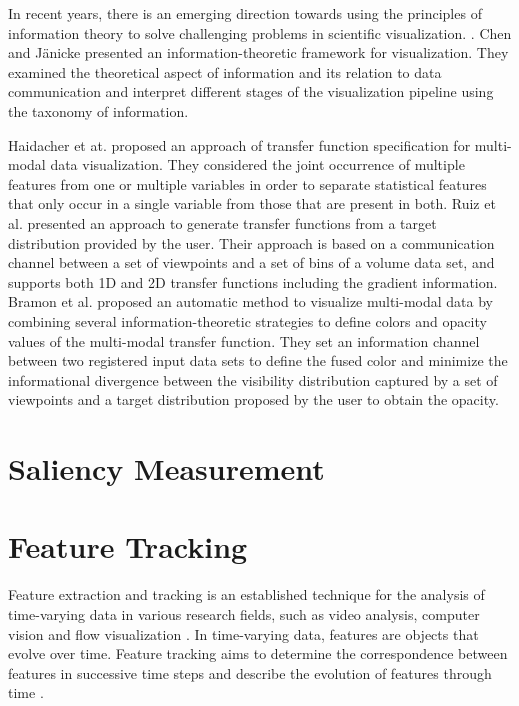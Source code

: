 In recent years, there is an emerging direction towards using the principles of information theory to solve challenging problems in scientific visualization. \cite{wang_information_2011}. Chen and J{\"a}nicke \cite{chen_information-theoretic_2010} presented an information-theoretic framework for visualization. They examined the theoretical aspect of information and its relation to data communication and interpret different stages of the visualization pipeline using the taxonomy of information.

Haidacher et at. \cite{haidacher_information-based_2008} proposed an approach of transfer function specification for multi-modal data visualization. They considered the joint occurrence of multiple features from one or multiple variables in order to separate statistical features that only occur in a single variable from those that are present in both.
Ruiz et al. \cite{ruiz_automatic_2011} presented an approach to generate transfer functions from a target distribution provided by the user. Their approach is based on a communication channel between a set of viewpoints and a set of bins of a volume data set, and supports both 1D and 2D transfer functions including the gradient information.
Bramon et al. \cite{bramon_information_2013} proposed an automatic method to visualize multi-modal data by combining several information-theoretic strategies to define colors and opacity values of the multi-modal transfer function.
They set an information channel between two registered input data sets to define the fused color and minimize the informational divergence between the visibility distribution captured by a set of viewpoints and a target distribution proposed by the user to obtain the opacity.

\section{Saliency Measurement}
\cite{diaz_perceptual_2015}
\cite{diaz_iriberri_enhanced_2013}

\cite{healey_combining_2001}
\cite{hall_trainable_2004}
\cite{carmi_causal_2006}
\cite{treue_visual_2003}
\cite{kadir_saliency_2001}

\cite{itti_model_1998}
\cite{harel_graph-based_2006}
\cite{cui_measuring_2006}
\cite{lee_mesh_2005}
\cite{duan_visual_2011}
\cite{kim_saliency-guided_2006}
\cite{shen_spatiotemporal_2015}

\section{Feature Tracking}
Feature extraction and tracking is an established technique for the analysis of time-varying data in various research fields, such as video analysis, computer vision and flow visualization \cite{muelder_interactive_2009}.
In time-varying data, features are objects that evolve over time. Feature tracking aims to determine the correspondence between features in successive time steps and describe the evolution of features through time \cite{post_state_2003}.

